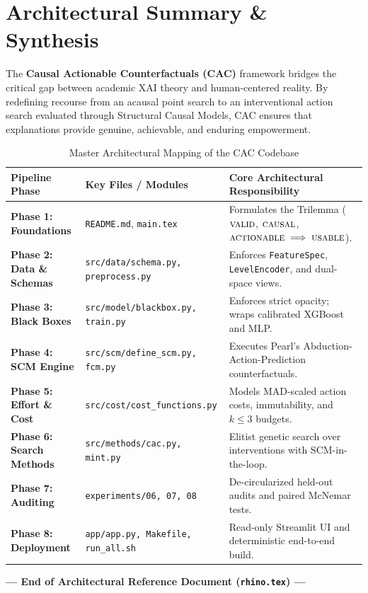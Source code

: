 \documentclass[11pt,a4paper]{article}
\newcommand{\Valid}{\textsc{valid}}
\newcommand{\Causal}{\textsc{causal}}
\newcommand{\Action}{\textsc{actionable}}
\newcommand{\Usable}{\textsc{usable}}
\begin{document}
\newpage
\section{Architectural Summary \& Synthesis}
\label{sec:summary}

The \textbf{Causal Actionable Counterfactuals (CAC)} framework bridges the critical gap between academic XAI theory and human-centered reality. By redefining recourse from an acausal point search to an interventional action search evaluated through Structural Causal Models, CAC ensures that explanations provide genuine, achievable, and enduring empowerment.

\begin{table}[htbp]
\centering
\caption{Master Architectural Mapping of the CAC Codebase}
\label{tab:master_map}
\small
\begin{tabularx}{\textwidth}{llX}
\toprule
\textbf{Pipeline Phase} & \textbf{Key Files / Modules} & \textbf{Core Architectural Responsibility} \\
\midrule
\textbf{Phase 1: Foundations} & \texttt{README.md}, \texttt{main.tex} & Formulates the Trilemma ($\Valid$, $\Causal$, $\Action \implies \Usable$). \\
\textbf{Phase 2: Data \& Schemas} & \texttt{src/data/schema.py, preprocess.py} & Enforces \texttt{FeatureSpec}, \texttt{LevelEncoder}, and dual-space views. \\
\textbf{Phase 3: Black Boxes} & \texttt{src/model/blackbox.py, train.py} & Enforces strict opacity; wraps calibrated XGBoost and MLP. \\
\textbf{Phase 4: SCM Engine} & \texttt{src/scm/define\_scm.py, fcm.py} & Executes Pearl's Abduction-Action-Prediction counterfactuals. \\
\textbf{Phase 5: Effort \& Cost} & \texttt{src/cost/cost\_functions.py} & Models MAD-scaled action costs, immutability, and $k \le 3$ budgets. \\
\textbf{Phase 6: Search Methods} & \texttt{src/methods/cac.py, mint.py} & Elitist genetic search over interventions with SCM-in-the-loop. \\
\textbf{Phase 7: Auditing} & \texttt{experiments/06, 07, 08} & De-circularized held-out audits and paired McNemar tests. \\
\textbf{Phase 8: Deployment} & \texttt{app/app.py, Makefile, run\_all.sh} & Read-only Streamlit UI and deterministic end-to-end build. \\
\bottomrule
\end{tabularx}
\end{table}

\bigskip
\begin{center}
\textbf{--- End of Architectural Reference Document (\texttt{rhino.tex}) ---}
\end{center}
\end{document}
